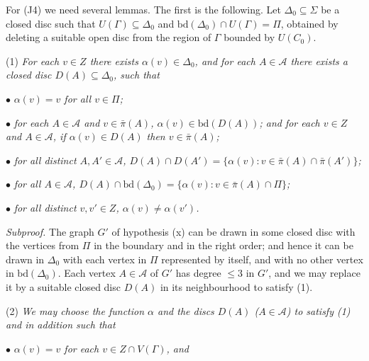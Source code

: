 For (J4) we need several lemmas. The first is the following. Let $\Delta_0 \subseteq \Sigma$ be a closed disc such that $U(\Gamma) \subseteq \Delta_0$ and $\text{bd}(\Delta_0) \cap U(\Gamma) = \Pi$, obtained by deleting a suitable open disc from the region of $\Gamma$ bounded by $U(C_0)$.

\hspace*{12pt}(1) \textit{For each $v \in Z$ there exists $\alpha(v) \in \Delta_0$, and for each $A \in \mathcal{A}$ there exists a closed disc $D(A) \subseteq \Delta_0$, such that}

\hspace*{12pt}$\bullet$ \textit{$\alpha(v) = v$ for all $v \in \Pi$;}

\hspace*{12pt}$\bullet$ \textit{for each $A \in \mathcal{A}$ and $v \in \bar{\pi}(A)$, $\alpha(v) \in \text{bd}(D(A))$; and for each $v \in Z$ and $A \in \mathcal{A}$, if $\alpha(v) \in D(A)$ then $v \in \bar{\pi}(A)$;}

\hspace*{12pt}$\bullet$ \textit{for all distinct $A, A' \in \mathcal{A}$, $D(A) \cap D(A') = \{\alpha(v) : v \in \bar{\pi}(A) \cap \bar{\pi}(A')\}$;}

\hspace*{12pt}$\bullet$ \textit{for all $A \in \mathcal{A}$, $D(A) \cap \text{bd}(\Delta_0) = \{\alpha(v) : v \in \bar{\pi}(A) \cap \Pi\}$;}

\hspace*{12pt}$\bullet$ \textit{for all distinct $v, v' \in Z$, $\alpha(v) \ne \alpha(v')$.}

\textit{Subproof.} The graph $G'$ of hypothesis (x) can be drawn in some closed disc with the vertices from $\Pi$ in the boundary and in the right order; and hence it can be drawn in $\Delta_0$ with each vertex in $\Pi$ represented by itself, and with no other vertex in $\text{bd}(\Delta_0)$. Each vertex $A \in \mathcal{A}$ of $G'$ has degree $\le 3$ in $G'$, and we may replace it by a suitable closed disc $D(A)$ in its neighbourhood to satisfy (1).

\hspace*{12pt}(2) \textit{We may choose the function $\alpha$ and the discs $D(A)$ ($A \in \mathcal{A}$) to satisfy (1) and in addition such that}

\hspace*{12pt}$\bullet$ \textit{$\alpha(v) = v$ for each $v \in Z \cap V(\Gamma)$, and}

